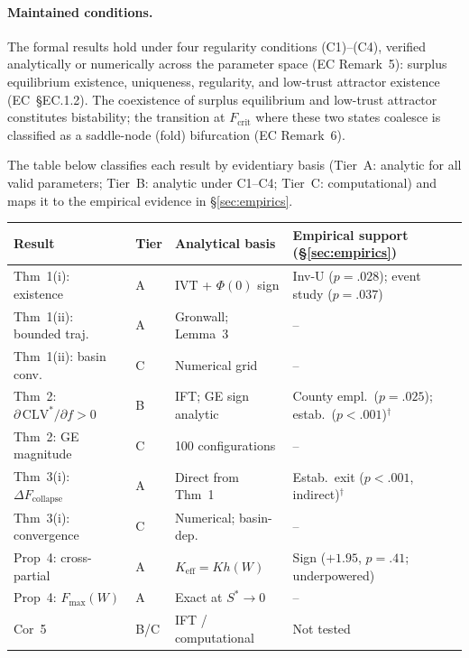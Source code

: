 \documentclass[msom,dblanonrev]{informs4}
\newcommand{\Keff}{K_{\mathrm{eff}}}
\begin{document}
\paragraph{Maintained conditions.}
The formal results hold under four regularity conditions (C1)--(C4), verified analytically or numerically across the parameter space (EC Remark~5): surplus equilibrium existence, uniqueness, regularity, and low-trust attractor existence (EC~\S EC.1.2). The coexistence of surplus equilibrium and low-trust attractor constitutes bistability; the transition at $F_{\mathrm{crit}}$ where these two states coalesce is classified as a saddle-node (fold) bifurcation (EC Remark~6).

\begin{remark}\label{rem:transparency}
The table below classifies each result by evidentiary basis (Tier~A: analytic for all valid parameters; Tier~B: analytic under C1--C4; Tier~C: computational) and maps it to the empirical evidence in \S\ref{sec:empirics}.
\smallskip

\noindent
{\small\renewcommand{\arraystretch}{0.92}%
\begin{tabular}{@{}p{}p{}p{}p{}@{}}
\toprule
\textbf{Result} & \textbf{Tier} & \textbf{Analytical basis} & \textbf{Empirical support (\S\ref{sec:empirics})} \\
\midrule
Thm~1(i): existence & A & IVT + $\Phi(0)$ sign & Inv-U ($p{=}.028$); event study ($p{=}.037$) \\
Thm~1(ii): bounded traj.\ & A & Gronwall; Lemma~3 & -- \\
Thm~1(ii): basin conv.\ & C & Numerical grid & -- \\
Thm~2: $\partial\,\mathrm{CLV}^*/\partial f > 0$ & B & IFT; GE sign analytic & County empl.\ ($p{=}.025$); estab.\ ($p{<}.001$)$^\dagger$ \\
Thm~2: GE magnitude & C & 100 configurations & -- \\
Thm~3(i): $\Delta F_{\mathrm{collapse}}$ & A & Direct from Thm~1 & Estab.\ exit ($p{<}.001$, indirect)$^\dagger$ \\
Thm~3(i): convergence & C & Numerical; basin-dep.\ & -- \\
Prop~4: cross-partial & A & $\Keff = Kh(W)$ & Sign ($+1.95$, $p{=}.41$; underpowered) \\
Prop~4: $F_{\max}(W)$ & A & Exact at $S^*{\to}0$ & -- \\
Cor~5 & B/C & IFT / computational & Not tested \\
\bottomrule
\end{tabular}}

\end{remark}
\end{document}
